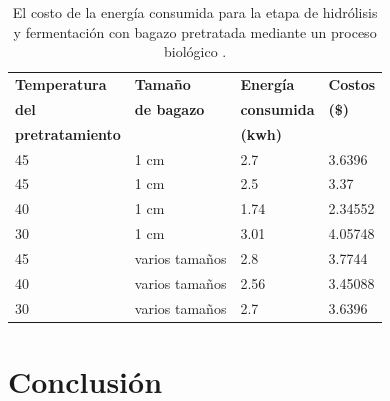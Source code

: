 \documentclass[12pt]{article}
\begin{document}
	\begin{table}[H]
		\centering
			\label{energi_fermentacion en biologico}
		\caption{El costo de la energía consumida para la etapa de hidrólisis y fermentación con bagazo pretratada mediante un proceso biológico . }
	\resizebox{12 cm}{!} {
		\begin{tabular}{|l|l|l|l|}
				\hline
\textbf{Temperatura} & \textbf{Tamaño } & \textbf{Energía } & \textbf{Costos } \\ 
\textbf{del} &	\textbf{ de bagazo}   & 	\textbf{consumida  }& 	\textbf{(\$)} \\ 
\textbf{pretratamiento}  &    & \textbf{(kwh)} &  \\ \hline
			45 & 1 cm & 2.7 & 3.6396  \\ \hline
			45 & 1 cm & 2.5 & 3.37  \\ \hline
			40 & 1 cm & 1.74 & 2.34552  \\ \hline
			30 & 1 cm & 3.01 & 4.05748  \\ \hline
			45 & varios tamaños & 2.8 & 3.7744  \\ \hline
			40 & varios tamaños & 2.56 & 3.45088  \\ \hline
			30 & varios tamaños & 2.7 & 3.6396  \\ \hline
		\end{tabular}}

	\end{table}
	
	
			
		\section*{Conclusión}
			
			
		
		\newpage
	
		 
		
	


	   \newpage
\end{document}
